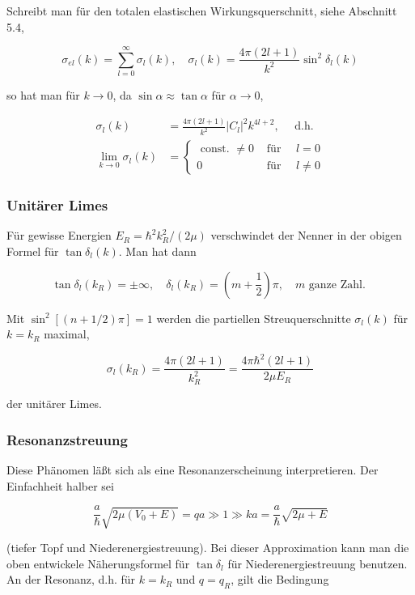 \documentclass[10pt, letterpaper]{article}
\begin{document}
Schreibt man für den totalen elastischen Wirkungsquerschnitt, siehe Abschnitt 5.4,

$$
\sigma_{e l}(k)=\sum_{l=0}^{\infty} \sigma_{l}(k), \quad \sigma_{l}(k)=\frac{4 \pi(2 l+1)}{k^{2}} \sin ^{2} \delta_{l}(k)
$$

so hat man für $k \rightarrow 0$, da $\sin \alpha \approx \tan \alpha$ für $\alpha \rightarrow 0$,

$$
\begin{aligned}
\sigma_{l}(k) & =\frac{4 \pi(2 l+1)}{k^{2}}\left|C_{l}\right|^{2} k^{4 l+2}, \quad \text { d.h. } \\
\lim _{k \rightarrow 0} \sigma_{l}(k) & = \begin{cases}\text { const. } \neq 0 & \text { für } \quad l=0 \\
0 & \text { für } \quad l \neq 0\end{cases}
\end{aligned}
$$

\subsubsection*{Unitärer Limes}
Für gewisse Energien $E_{R}=\hbar^{2} k_{R}^{2} /(2 \mu)$ verschwindet der Nenner in der obigen Formel für $\tan \delta_{l}(k)$. Man hat dann

$$
\tan \delta_{l}\left(k_{R}\right)= \pm \infty, \quad \delta_{l}\left(k_{R}\right)=\left(m+\frac{1}{2}\right) \pi, \quad m \text { ganze Zahl. }
$$

Mit $\sin ^{2}[(n+1 / 2) \pi]=1$ werden die partiellen Streuquerschnitte $\sigma_{l}(k)$ für $k=k_{R}$ maximal,

$$
\sigma_{l}\left(k_{R}\right)=\frac{4 \pi(2 l+1)}{k_{R}^{2}}=\frac{4 \pi \hbar^{2}(2 l+1)}{2 \mu E_{R}}
$$

der unitärer Limes.

\subsubsection*{Resonanzstreuung}
Diese Phänomen läßt sich als eine Resonanzerscheinung interpretieren. Der Einfachheit halber sei

$$
\frac{a}{\hbar} \sqrt{2 \mu\left(V_{0}+E\right)}=q a \gg 1 \gg k a=\frac{a}{\hbar} \sqrt{2 \mu+E}
$$

(tiefer Topf und Niederenergiestreuung). Bei dieser Approximation kann man die oben entwickele Näherungsformel für $\tan \delta_{l}$ für Niederenergiestreuung benutzen. An der Resonanz, d.h. für $k=k_{R}$ und $q=q_{R}$, gilt die Bedingung
\end{document}
